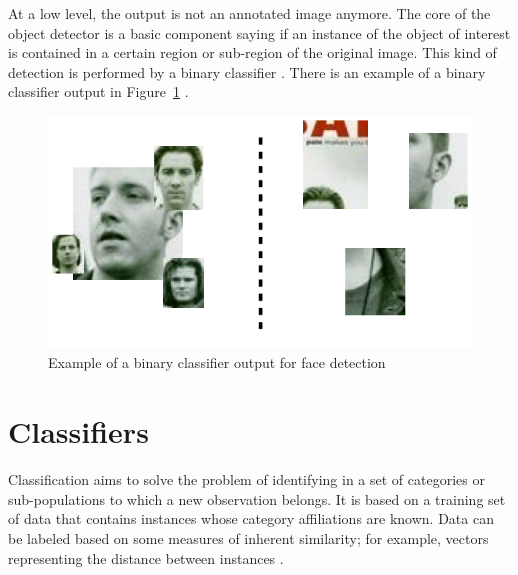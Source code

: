 \noindent At a low level, the output is not an annotated image anymore. The core of the object detector is a basic component saying if an instance of the object of interest is contained in a certain region or sub-region of the original image. This kind of detection is performed by a binary classifier \cite{DIN08}. There is an example of a binary classifier output in Figure~\ref{output_example_face_detection_binary_classifier} \cite{DIN08}.
\newline

\begin{figure}[!h]
\begin{center}
\noindent \includegraphics[scale=0.5]{figures/output_example_face_detection_binary_classifier} 
\newline
\caption{Example of a binary classifier output for face detection \cite{DIN08}}
\label{output_example_face_detection_binary_classifier}
\end{center} 
\end{figure}

\section{Classifiers}

\vspace{\baselineskip}
\noindent Classification aims to solve the problem of identifying in a set of categories or sub-populations to which a new observation belongs. It is based on a training set of data that contains instances whose category affiliations are known. Data can be labeled based on some measures of inherent similarity; for example, vectors representing the distance between instances \cite{CLASS}.
\newline









